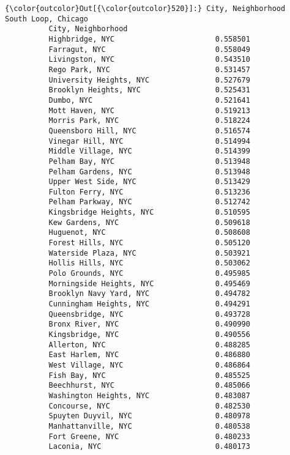 \documentclass[11pt]{article}
\begin{document}
\begin{Verbatim}[commandchars=\\\{\}]
{\color{outcolor}Out[{\color{outcolor}520}]:} City, Neighborhood         South Loop, Chicago
          City, Neighborhood                            
          Highbridge, NYC                       0.558501
          Farragut, NYC                         0.558049
          Livingston, NYC                       0.543510
          Rego Park, NYC                        0.531457
          University Heights, NYC               0.527679
          Brooklyn Heights, NYC                 0.525431
          Dumbo, NYC                            0.521641
          Mott Haven, NYC                       0.519213
          Morris Park, NYC                      0.518224
          Queensboro Hill, NYC                  0.516574
          Vinegar Hill, NYC                     0.514994
          Middle Village, NYC                   0.514399
          Pelham Bay, NYC                       0.513948
          Pelham Gardens, NYC                   0.513948
          Upper West Side, NYC                  0.513429
          Fulton Ferry, NYC                     0.513236
          Pelham Parkway, NYC                   0.512742
          Kingsbridge Heights, NYC              0.510595
          Kew Gardens, NYC                      0.509618
          Huguenot, NYC                         0.508608
          Forest Hills, NYC                     0.505120
          Waterside Plaza, NYC                  0.503921
          Hollis Hills, NYC                     0.503062
          Polo Grounds, NYC                     0.495985
          Morningside Heights, NYC              0.495469
          Brooklyn Navy Yard, NYC               0.494782
          Cunningham Heights, NYC               0.494291
          Queensbridge, NYC                     0.493728
          Bronx River, NYC                      0.490990
          Kingsbridge, NYC                      0.490556
          Allerton, NYC                         0.488285
          East Harlem, NYC                      0.486880
          West Village, NYC                     0.486864
          Fish Bay, NYC                         0.485525
          Beechhurst, NYC                       0.485066
          Washington Heights, NYC               0.483087
          Concourse, NYC                        0.482530
          Spuyten Duyvil, NYC                   0.480978
          Manhattanville, NYC                   0.480538
          Fort Greene, NYC                      0.480233
          Laconia, NYC                          0.480173

\end{Verbatim}
\end{document}
